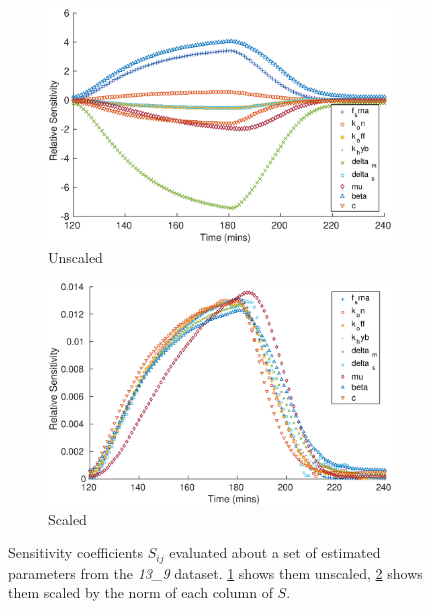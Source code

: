 \documentclass[10pt,journal]{./IEEE_latex_class/IEEEtran}
\begin{document}
\begin{figure}[h]	
	\begin{subfigure}[h]{0.49\textwidth}
    \centering
        \includegraphics[scale = 0.3]{Sensitivity_unscaled}
        \caption{Unscaled}
        \label{SensitivityMatrix_unscaled} 
    \end{subfigure}
    \begin{subfigure}[h]{0.49\textwidth}
    \centering
        \includegraphics[scale = 0.3]{Sensitivity_scaled}
        \caption{Scaled}
                \label{SensitivityMatrix_scaled} 
    \end{subfigure}
    \caption{Sensitivity coefficients $S_{ij}$ evaluated about a set of estimated parameters from the \textit{13\_9} dataset. \ref{SensitivityMatrix_unscaled} shows them unscaled, \ref{SensitivityMatrix_scaled} shows them scaled by the norm of each column of $S$.} 
\label{SensitivityMatrix}   
\end{figure}
\end{document}

